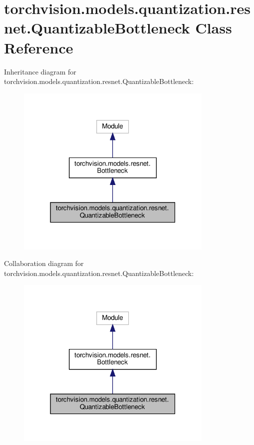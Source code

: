 \hypertarget{classtorchvision_1_1models_1_1quantization_1_1resnet_1_1QuantizableBottleneck}{}\section{torchvision.\+models.\+quantization.\+resnet.\+Quantizable\+Bottleneck Class Reference}
\label{classtorchvision_1_1models_1_1quantization_1_1resnet_1_1QuantizableBottleneck}


Inheritance diagram for torchvision.\+models.\+quantization.\+resnet.\+Quantizable\+Bottleneck\+:
\nopagebreak
\begin{figure}[H]
\begin{center}
\leavevmode
\includegraphics[width=267pt]{classtorchvision_1_1models_1_1quantization_1_1resnet_1_1QuantizableBottleneck__inherit__graph}
\end{center}
\end{figure}


Collaboration diagram for torchvision.\+models.\+quantization.\+resnet.\+Quantizable\+Bottleneck\+:
\nopagebreak
\begin{figure}[H]
\begin{center}
\leavevmode
\includegraphics[width=267pt]{classtorchvision_1_1models_1_1quantization_1_1resnet_1_1QuantizableBottleneck__coll__graph}
\end{center}
\end{figure}
